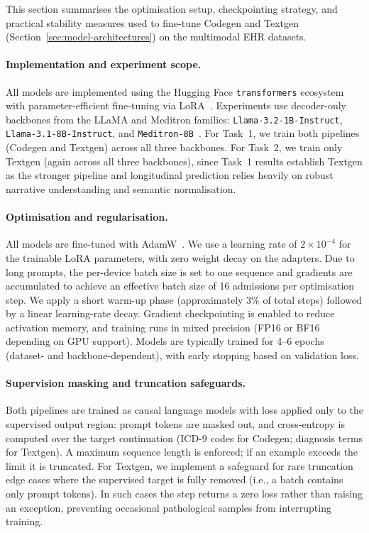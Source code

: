 This section summarises the optimisation setup, checkpointing strategy, and practical stability measures used to fine-tune Codegen and Textgen (Section~\ref{sec:model-architectures}) on the multimodal EHR datasets.

\paragraph{Implementation and experiment scope.}
All models are implemented using the Hugging Face \texttt{transformers} ecosystem~\cite{wolf2020transformers} with parameter-efficient fine-tuning via LoRA~\cite{hu2021lora}. Experiments use decoder-only backbones from the LLaMA and Meditron families: \texttt{Llama-3.2-1B-Instruct}, \texttt{Llama-3.1-8B-Instruct}, and \texttt{Meditron-8B}~\cite{touvron2023llama,chen2023meditron}. For Task~1, we train both pipelines (Codegen and Textgen) across all three backbones. For Task~2, we train only Textgen (again across all three backbones), since Task~1 results establish Textgen as the stronger pipeline and longitudinal prediction relies heavily on robust narrative understanding and semantic normalisation.

\paragraph{Optimisation and regularisation.}
All models are fine-tuned with AdamW~\cite{loshchilov2019decoupled}. We use a learning rate of $2\times 10^{-4}$ for the trainable LoRA parameters, with zero weight decay on the adapters. Due to long prompts, the per-device batch size is set to one sequence and gradients are accumulated to achieve an effective batch size of 16 admissions per optimisation step. We apply a short warm-up phase (approximately $3\%$ of total steps) followed by a linear learning-rate decay. Gradient checkpointing is enabled to reduce activation memory, and training runs in mixed precision (FP16 or BF16 depending on GPU support). Models are typically trained for 4--6 epochs (dataset- and backbone-dependent), with early stopping based on validation loss.

\paragraph{Supervision masking and truncation safeguards.}
Both pipelines are trained as causal language models with loss applied only to the supervised output region: prompt tokens are masked out, and cross-entropy is computed over the target continuation (ICD-9 codes for Codegen; diagnosis terms for Textgen). A maximum sequence length is enforced; if an example exceeds the limit it is truncated. For Textgen, we implement a safeguard for rare truncation edge cases where the supervised target is fully removed (i.e., a batch contains only prompt tokens). In such cases the step returns a zero loss rather than raising an exception, preventing occasional pathological samples from interrupting training.

